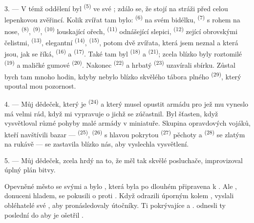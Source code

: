 3. --- V témž oddělení byl  \textsuperscript{(5)} ve své
; zdálo se, že stojí na stráži před celou lepenkovou zvěřincí. Kolik
zvířat tam bylo:  \textsuperscript{(6)} na svém bidélku,
 \textsuperscript{(7)} s rohem na nose, 
\textsuperscript{(8)},  \textsuperscript{(9)}, 
\textsuperscript{(10)} louskající ořech,  \textsuperscript{(11)} odnášející
slepici,  \textsuperscript{(12)} zející obrovskými čelistmi,
 \textsuperscript{(13)}, elegantní  \textsuperscript{(14)},
 \textsuperscript{(15)}, potom dvě zvířata, která jsem neznal a která jsou, jak
se říká,  \textsuperscript{(16)} a
 \textsuperscript{(17)}. Také tam byl 
\textsuperscript{(18)} a  \textsuperscript{(21)}; zcela blízko byly roztomilé
 \textsuperscript{(19)} a maličké gumové 
\textsuperscript{(20)}. Nakonec  \textsuperscript{(22)} a hrbatý
 \textsuperscript{(23)} uzavírali sbírku. Zůstal bych tam mnoho hodin,
kdyby nebylo blízko skvělého tábora plného  \textsuperscript{(29)},
který upoutal mou pozornost.

\VUsaut{4.0mm}
\VUsaut{2.8mm}

4. --- Můj dědeček, který je  \textsuperscript{(24)} a který musel opustit
armádu pro  jež mu vyneslo  má velmi rád, když mi
vypravuje o  jichž se zúčastnil. Byl šťasten, když vysvětloval různé pohyby
malé armády v miniatuře. Skupina opravdových vojáků, kteří navštívili bazar ---
 \textsuperscript{(25)},  \textsuperscript{(26)} s
hlavou pokrytou   \textsuperscript{(27)} pěchoty a
 \textsuperscript{(28)} se zlatým  na rukávě
--- se zastavila blízko nás, aby vyslechla vysvětlení.

5. --- Můj dědeček, zcela hrdý na to, že měl tak skvělé posluchače, improvizoval úplný plán
bitvy.

Opevněné město se svými  a  bylo 
, která byla po dlouhém  připravena k
. Ale , donuceni hladem, se pokusili o 
proti  . Když odrazili  úporným
 kolem , vyslali  obléhatelé své
, aby pronásledovaly  útočníky. Ti
 pokrývajíce   a .
 odnesli ty poslední do  aby je ošetřil
.

